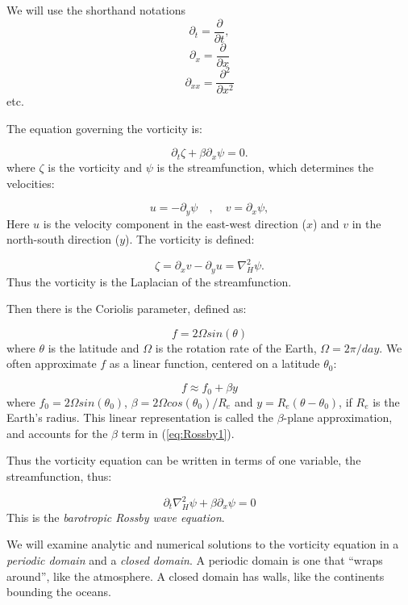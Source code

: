 \documentclass[%
oneside,                 %
final,                   %
10pt]{article}
\begin{document}
We will use the shorthand notations
\[
\partial_t = \frac{\partial }{\partial t},
\]
\[
\partial_x = \frac{\partial }{\partial x}
\]
\[
\partial_{xx} = \frac{\partial^2 }{\partial x^2}
\]
etc. 

The equation governing the vorticity is:

\begin{equation}
  \label{eq:Rossby1}
   \partial_t \zeta  + \beta \partial_x\psi = 0.
 \end{equation}
where $\zeta$ is the vorticity and $\psi$ is the streamfunction, which determines the velocities:

\begin{equation}
	u = -\partial_y \psi \quad,\quad v = \partial_x \psi,
\end{equation}
Here $u$ is the velocity component in the east-west direction ($x$)
and $v$ in the north-south direction ($y$). The vorticity is
defined:

\begin{equation}
\label{eq:Rossby2}
	\zeta = \partial_x v -\partial_y u = \nabla_H^2 \psi.
\end{equation}
Thus the vorticity is the Laplacian of the streamfunction. 

Then there is the Coriolis parameter, defined as:

\begin{equation}
f = 2 \Omega sin(\theta)
\end{equation}
where $\theta$ is the latitude and $\Omega$ is the rotation
rate of the Earth, $\Omega=2 \pi/day$. We often approximate
$f$ as a linear function, centered on a latitude $\theta_0$:

\begin{equation}
f \approx f_0 + \beta y
\end{equation}
where $f_0 = 2 \Omega sin(\theta_0)$, $\beta = 2 \Omega
cos(\theta_0)/R_e$ and $y = R_e (\theta - \theta_0)$, if $R_e$ is the
Earth's radius. This linear representation is called the
$\beta$-plane approximation, and accounts for the $\beta$ term in
(\ref{eq:Rossby1}).

Thus the vorticity equation can be written in terms of one variable,
the streamfunction, thus:

\begin{equation}
  \label{eq:Rossby}
\partial_t \nabla_H^2 \psi  + \beta \partial_x\psi = 0
 \end{equation}
This is the \emph{barotropic Rossby wave equation}.


We will examine analytic and numerical solutions to the vorticity
equation in a \emph{periodic domain} and a \emph{closed domain}. A
periodic domain is one that ``wraps around'', like the atmosphere. A
closed domain has walls, like the continents bounding the oceans.
\end{document}
